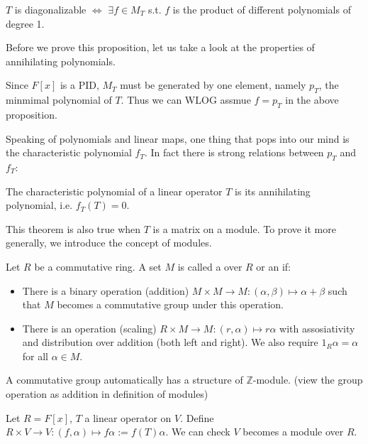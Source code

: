 \begin{proposition}
	\label{p_t decomposition}
	$T$ is diagonalizable $\iff$ $\exists f\in M_T$ s.t. $f$ is
	the product of different polynomials of degree 1.
\end{proposition}

Before we prove this proposition, let us take a look at the properties
of annihilating polynomials.

Since $F[x]$ is a PID, $M_T$ must be generated by one element,
namely $p_T$, the minmimal polynomial of $T$.
Thus we can WLOG assmue $f=p_T$ in the above proposition.

Speaking of polynomials and linear maps, one thing that pops
into our mind is the characteristic polynomial $f_T$. In
fact there is strong relations between $p_T$ and $f_T$:

\begin{theorem}
	\label{C-H}
    The characteristic polynomial of a linear operator $T$ is
	its annihilating polynomial, i.e. $f_T(T) = 0$.
\end{theorem}
This theorem is also true when $T$ is a matrix on a module.
To prove it more generally, we introduce the concept of modules.

\begin{definition}
	Let $R$ be a commutative ring. A set $M$ is called a  over $R$
	or an  if:
	\begin{itemize}
		\item There is a binary operation (addition)
			$M\times M\to M: (\alpha,\beta)\mapsto \alpha+\beta$
			such that $M$ becomes a commutative group under this operation.
		\item There is an operation (scaling)
			$R\times M\to M: (r, \alpha)\mapsto r\alpha$ with
			assosiativity and distribution over addition (both left and right).
			We also require $1_R\alpha = \alpha$ for all  $\alpha\in M$.
	\end{itemize}
\end{definition}

\begin{example}
    A commutative group automatically has a structure of $\mathbb{Z}$-module.
	(view the group operation as addition in definition of modules)
\end{example}
\begin{example}
	Let $R = F[x]$,  $T$ a linear operator on  $V$.
	Define  $R\times V\to V: (f, \alpha)\mapsto f\alpha := f(T)\alpha$.
	We can check $V$ becomes a module over $R$.
\end{example}

